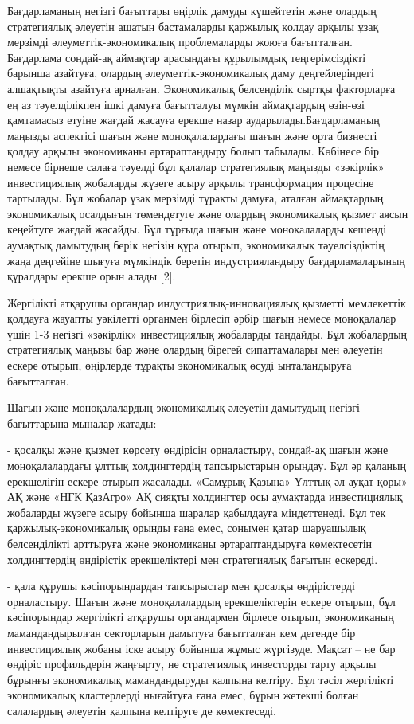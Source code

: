 \begin{multicols}{2}
Бағдарламаның негізгі бағыттары өңірлік дамуды күшейтетін және олардың
стратегиялық әлеуетін ашатын бастамаларды қаржылық қолдау арқылы ұзақ
мерзімді әлеуметтік-экономикалық проблемаларды жоюға бағытталған.
Бағдарлама сондай-ақ аймақтар арасындағы құрылымдық теңгерімсіздікті
барынша азайтуға, олардың әлеуметтік-экономикалық даму деңгейлеріндегі
алшақтықты азайтуға арналған. Экономикалық белсенділік сыртқы
факторларға ең аз тәуелділікпен ішкі дамуға бағытталуы мүмкін
аймақтардың өзін-өзі қамтамасыз етуіне жағдай жасауға ерекше назар
аударылады.Бағдарламаның маңызды аспектісі шағын және моноқалалардағы
шағын және орта бизнесті қолдау арқылы экономиканы әртараптандыру болып
табылады. Көбінесе бір немесе бірнеше салаға тәуелді бұл қалалар
стратегиялық маңызды «зәкірлік» инвестициялық жобаларды жүзеге асыру
арқылы трансформация процесіне тартылады. Бұл жобалар ұзақ мерзімді
тұрақты дамуға, аталған аймақтардың экономикалық осалдығын төмендетуге
және олардың экономикалық қызмет аясын кеңейтуге жағдай жасайды. Бұл
тұрғыда шағын және моноқалаларды кешенді аумақтық дамытудың берік
негізін құра отырып, экономикалық тәуелсіздіктің жаңа деңгейіне шығуға
мүмкіндік беретін индустрияландыру бағдарламаларының құралдары ерекше
орын алады {[}2{]}.

Жергілікті атқарушы органдар индустриялық-инновациялық қызметті
мемлекеттік қолдауға жауапты уәкілетті органмен бірлесіп әрбір шағын
немесе моноқалалар үшін 1-3 негізгі «зәкірлік» инвестициялық жобаларды
таңдайды. Бұл жобалардың стратегиялық маңызы бар және олардың бірегей
сипаттамалары мен әлеуетін ескере отырып, өңірлерде тұрақты экономикалық
өсуді ынталандыруға бағытталған.

Шағын және моноқалалардың экономикалық әлеуетін дамытудың негізгі
бағыттарына мыналар жатады:

- қосалқы және қызмет көрсету өндірісін орналастыру, сондай-ақ шағын
және моноқалалардағы ұлттық холдингтердің тапсырыстарын орындау. Бұл әр
қаланың ерекшелігін ескере отырып жасалады. «Самұрық-Қазына» Ұлттық
әл-ауқат қоры» АҚ және «НГК ҚазАгро» АҚ сияқты холдингтер осы аумақтарда
инвестициялық жобаларды жүзеге асыру бойынша шаралар қабылдауға
міндеттенеді. Бұл тек қаржылық-экономикалық орынды ғана емес, сонымен
қатар шаруашылық белсенділікті арттыруға және экономиканы
әртараптандыруға көмектесетін холдингтердің өндірістік ерекшеліктері мен
стратегиялық бағытын ескереді.

- қала құрушы кәсіпорындардан тапсырыстар мен қосалқы өндірістерді
орналастыру. Шағын және моноқалалардың ерекшеліктерін ескере отырып, бұл
кәсіпорындар жергілікті атқарушы органдармен бірлесе отырып,
экономиканың мамандандырылған секторларын дамытуға бағытталған кем
дегенде бір инвестициялық жобаны іске асыру бойынша жұмыс жүргізуде.
Мақсат -- не бар өндіріс профильдерін жаңғырту, не стратегиялық
инвесторды тарту арқылы бұрынғы экономикалық мамандандыруды қалпына
келтіру. Бұл тәсіл жергілікті экономикалық кластерлерді нығайтуға ғана
емес, бұрын жетекші болған салалардың әлеуетін қалпына келтіруге де
көмектеседі.


\end{multicols}
